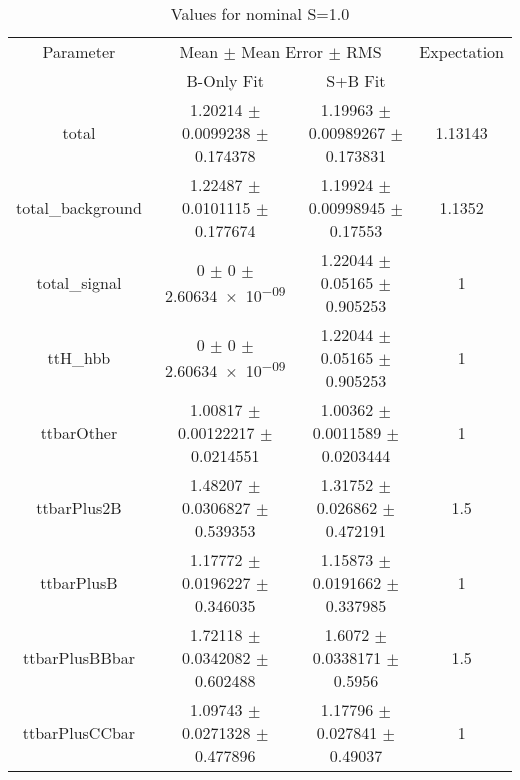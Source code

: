\begin{table}
\centering
\caption{Values for nominal S=1.0}
\begin{tabular}{cccc}
\toprule
Parameter & \multicolumn{2}{c}{Mean $\pm$ Mean Error $\pm$ RMS} & Expectation\\
 & B-Only Fit & S+B Fit & \\
\midrule
total & \num{1.20214} $\pm$ \num{0.0099238} $\pm$ \num{0.174378} & \num{1.19963} $\pm$ \num{0.00989267} $\pm$ \num{0.173831} & \num{1.13143}\\
total\_background & \num{1.22487} $\pm$ \num{0.0101115} $\pm$ \num{0.177674} & \num{1.19924} $\pm$ \num{0.00998945} $\pm$ \num{0.17553} & \num{1.1352}\\
total\_signal & \num{0} $\pm$ \num{0} $\pm$ \num{2.60634e-09} & \num{1.22044} $\pm$ \num{0.05165} $\pm$ \num{0.905253} & \num{1}\\
ttH\_hbb & \num{0} $\pm$ \num{0} $\pm$ \num{2.60634e-09} & \num{1.22044} $\pm$ \num{0.05165} $\pm$ \num{0.905253} & \num{1}\\
ttbarOther & \num{1.00817} $\pm$ \num{0.00122217} $\pm$ \num{0.0214551} & \num{1.00362} $\pm$ \num{0.0011589} $\pm$ \num{0.0203444} & \num{1}\\
ttbarPlus2B & \num{1.48207} $\pm$ \num{0.0306827} $\pm$ \num{0.539353} & \num{1.31752} $\pm$ \num{0.026862} $\pm$ \num{0.472191} & \num{1.5}\\
ttbarPlusB & \num{1.17772} $\pm$ \num{0.0196227} $\pm$ \num{0.346035} & \num{1.15873} $\pm$ \num{0.0191662} $\pm$ \num{0.337985} & \num{1}\\
ttbarPlusBBbar & \num{1.72118} $\pm$ \num{0.0342082} $\pm$ \num{0.602488} & \num{1.6072} $\pm$ \num{0.0338171} $\pm$ \num{0.5956} & \num{1.5}\\
ttbarPlusCCbar & \num{1.09743} $\pm$ \num{0.0271328} $\pm$ \num{0.477896} & \num{1.17796} $\pm$ \num{0.027841} $\pm$ \num{0.49037} & \num{1}\\
\bottomrule
\end{tabular}
\end{table}